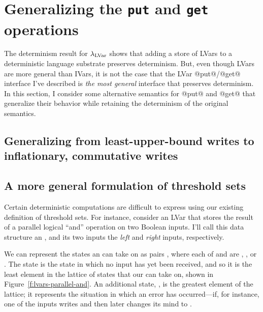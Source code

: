 \section{Generalizing the \lstinline|put| and \lstinline|get| operations}\label{s:lvars-generalizing}

The determinism result for $\lambda_{\textrm{LVar}}$ shows that adding a store of
LVars to a deterministic language substrate preserves determinism.
But, even though LVars are more general than IVars, it is not the case
that the LVar @put@/@get@ interface I've described is \emph{the most
  general} interface that preserves determinism.  In this section, I
consider some alternative semantics for @put@ and @get@ that
generalize their behavior while retaining the determinism of the
original semantics.

\subsection{Generalizing from least-upper-bound writes to inflationary, commutative writes} 




\subsection{A more general formulation of threshold sets}\label{subsection:lvars-a-more-general-formulation-of-threshold-sets}

Certain deterministic computations are difficult to express using our
existing definition of threshold sets.  For instance, consider an LVar
that stores the result of a parallel logical ``and'' operation on two
Boolean inputs.  I'll call this data structure an \emph{},
and its two inputs the \emph{left} and \emph{right} inputs,
respectively.

We can represent the states an  can take on as pairs
, where each of  and  are , , or
.  The  state is the state in which no input has
yet been received, and so it is the least element in the lattice of
states that our  can take on, shown in
Figure~\ref{f:lvars-parallel-and}.  An additional state, , is
the greatest element of the lattice; it represents the situation in
which an error has occurred---if, for instance, one of the inputs
writes  and then later changes its mind to .

